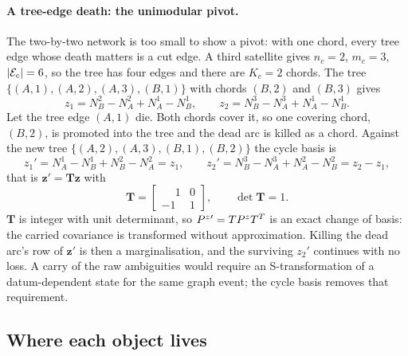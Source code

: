 \documentclass[main.tex]{subfiles}
\begin{document}
\paragraph{A tree-edge death: the unimodular pivot.}
The two-by-two network is too small to show a pivot: with one chord,
every tree edge whose death matters is a cut edge.  A third satellite
gives $n_c = 2$, $m_c = 3$, $|\mathcal{E}_c| = 6$, so the tree has four
edges and there are $K_c = 2$ chords.  The tree
$\{(A,1),(A,2),(A,3),(B,1)\}$ with chords $(B,2)$ and $(B,3)$ gives
\[
z_1 = N^2_B - N^2_A + N^1_A - N^1_B,
\qquad
z_2 = N^3_B - N^3_A + N^1_A - N^1_B .
\]
Let the tree edge $(A,1)$ die.  Both chords cover it, so one covering
chord, $(B,2)$, is promoted into the tree and the dead arc is killed as
a chord.  Against the new tree
$\{(A,2),(A,3),(B,1),(B,2)\}$ the cycle basis is
\[
z_1' = N^1_A - N^1_B + N^2_B - N^2_A = z_1,
\qquad
z_2' = N^3_B - N^3_A + N^2_A - N^2_B = z_2 - z_1,
\]
that is $\bm{z}' = \bm{T}\bm{z}$ with
\[
\bm{T} = \begin{bmatrix}\phantom{-}1 & 0\\ -1 & 1\end{bmatrix},
\qquad \det\bm{T} = 1 .
\]
$\bm{T}$ is integer with unit determinant, so
$P^{z}{}' = TP^{z}T^{T}$ is an exact change of basis: the
carried covariance is transformed without approximation.  Killing the
dead arc's row of $\bm{z}'$ is then a marginalisation, and the
surviving $z_2'$ continues with no loss.  A carry of the raw ambiguities
would require an S-transformation of a datum-dependent state for the
same graph event; the cycle basis removes that requirement.

\subsection{Where each object lives}
\label{sec:net-carry-map}
\end{document}
